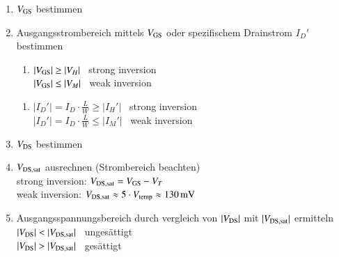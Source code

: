 {
\begin{enumerate}
    \item $V_{\rm GS}$ bestimmen 
    \item Ausgangsstrombereich mittels $V_{\rm GS}$ oder spezifischem Drainstrom $I_D'$ bestimmen 
    
    \begin{minipage}[t]{0.45\columnwidth}
        \begin{enumerate}[label=\bfseries\alph*)]
            \item $|V_{\rm GS}| \geq |V_H|$ \rightarrow\ strong inversion \\
                $|V_{\rm GS}| \leq |V_M|$ \rightarrow\ weak inversion
        \end{enumerate}
    \end{minipage}
    \hfill
    \begin{minipage}[t]{0.52\columnwidth}
        \begin{enumerate}[start=2, label=\bfseries\alph*)]
            \item $|I_D'| = I_D \cdot \frac{L}{W} \geq |I_H'|$ \rightarrow\ strong inversion \\
                $|I_D'| = I_D \cdot \frac{L}{W} \leq |I_M'|$ \rightarrow\ weak inversion 
        \end{enumerate}
    \end{minipage}

    \item $V_{\rm DS}$ bestimmen
    \item $V_{\rm DS,  sat}$ ausrechnen (Strombereich beachten)  \\
        strong inversion: $V_{\rm DS,  sat} = V_{\rm GS} - V_T$  \\
        weak inversion: $V_{\rm DS,  sat} \approx 5 \cdot V_{\rm temp} \approx \qty{130}{\milli \volt}$ 
    \item Ausgangsspannungsbereich durch vergleich von $|V_{\rm DS}|$ mit $|V_{\rm DS,  sat}|$ ermitteln  \\
        $|V_{\rm DS}| < |V_{\rm DS,  sat}|$ \rightarrow\ ungesättigt \\
        $|V_{\rm DS}| > |V_{\rm DS,  sat}|$ \rightarrow\ gesättigt
\end{enumerate}
}


